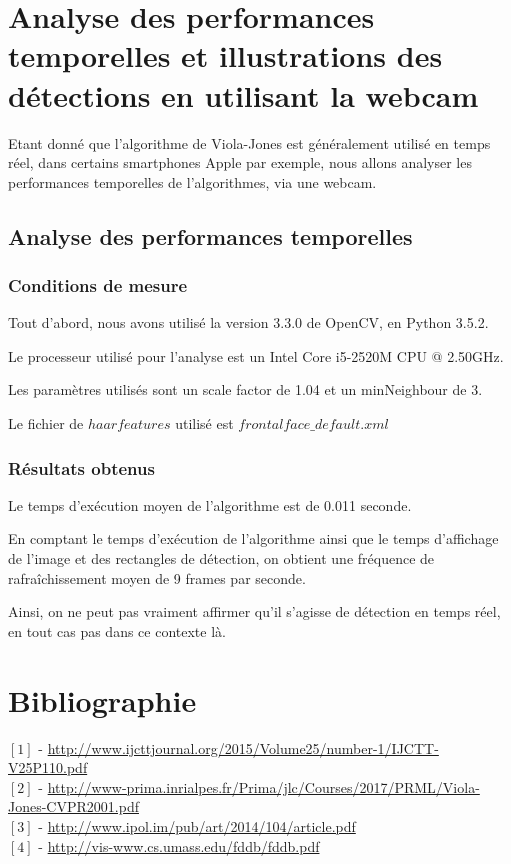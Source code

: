 \documentclass[a4paper,11pt]{article}
\begin{document}
	

\section{Analyse des performances temporelles et illustrations des détections en utilisant la webcam}

Etant donné que l'algorithme de Viola-Jones est généralement utilisé en temps réel, dans certains smartphones Apple par exemple, nous allons analyser les performances temporelles de l'algorithmes, via une webcam.

\subsection{Analyse des performances temporelles}
\subsubsection{Conditions de mesure}

Tout d'abord, nous avons utilisé la version 3.3.0 de OpenCV, en Python 3.5.2.

Le processeur utilisé pour l'analyse est un Intel Core i5-2520M CPU @ 2.50GHz.

Les paramètres utilisés sont un scale factor de 1.04 et un minNeighbour de 3.

Le fichier de $haar features$ utilisé est $frontalface\_default.xml$

\subsubsection{Résultats obtenus}

Le temps d'exécution moyen de l'algorithme est de 0.011 seconde.

En comptant le temps d'exécution de l'algorithme ainsi que le temps d'affichage de l'image et des rectangles de détection, on obtient une fréquence de rafraîchissement moyen de 9 frames par seconde.

Ainsi, on ne peut pas vraiment affirmer qu'il s'agisse de détection en temps réel, en tout cas pas dans ce contexte là.


\section{Bibliographie}
\flushleft
$[1]$ - \url{http://www.ijcttjournal.org/2015/Volume25/number-1/IJCTT-V25P110.pdf} \\
$[2]$ - \url{http://www-prima.inrialpes.fr/Prima/jlc/Courses/2017/PRML/Viola-Jones-CVPR2001.pdf} \\
$[3]$ - \url{http://www.ipol.im/pub/art/2014/104/article.pdf} \\
$[4]$ - \url{http://vis-www.cs.umass.edu/fddb/fddb.pdf}
\end{document}
